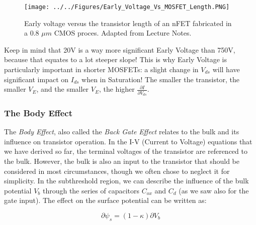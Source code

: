\begin{figure}[H]
    \centering
    \texttt{[image: ../../Figures/Early\_Voltage\_Vs\_MOSFET\_Length.PNG]}
    \caption{Early voltage versus the transistor length of an nFET fabricated in a 0.8 $\mu m$ CMOS proces. Adapted from Lecture Notes.}
    \label{fig:basalandcerebellum}
\end{figure}

Keep in mind that 20V is a way more significant Early Voltage than 750V, because that equates to a lot steeper slope! This is why Early Voltage is particularly important in shorter MOSFETs: a slight change in $V_{ds}$ will have significant impact on $I_{ds}$ when in Saturation! The smaller the transistor, the smaller $V_E$, and the smaller $V_E$, the higher $\frac{\partial I}{\partial V_{ds}}$. 

\subsubsection{The Body Effect}\label{sec:body_effect}

The \textit{Body Effect}, also called the \textit{Back Gate Effect} relates to the bulk and its influence on transistor operation. In the I-V (Current to Voltage) equations that we have derived so far, the terminal voltages of
the transistor are referenced to the bulk. However, the bulk is also an input to the transistor that should be considered in most circumstances, though we often chose to neglect it for simplicity.  In the subthreshold region, we can describe the influence of the bulk potential $V_b$ through the series of capacitors $C_{ox}$ and $C_d$ (as we saw also for the gate input).
The effect on the surface potential can be written as: 

\begin{equation}
    \partial \psi_s = (1-\kappa)\partial{V_b}
\end{equation}

